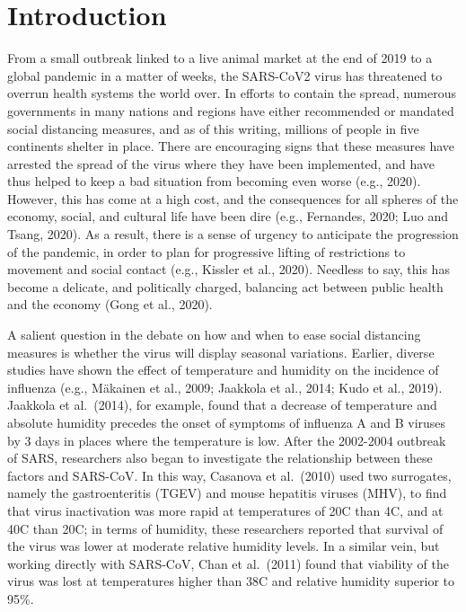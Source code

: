 \documentclass[]{elsarticle} %
\begin{document}
\hypertarget{introduction}{%
\section{Introduction}\label{introduction}}

From a small outbreak linked to a live animal market at the end of 2019
to a global pandemic in a matter of weeks, the SARS-CoV2 virus has
threatened to overrun health systems the world over. In efforts to
contain the spread, numerous governments in many nations and regions
have either recommended or mandated social distancing measures, and as
of this writing, millions of people in five continents shelter in place.
There are encouraging signs that these measures have arrested the spread
of the virus where they have been implemented, and have thus helped to
keep a bad situation from becoming even worse (e.g., 2020). However,
this has come at a high cost, and the consequences for all spheres of
the economy, social, and cultural life have been dire (e.g., Fernandes,
2020; Luo and Tsang, 2020). As a result, there is a sense of urgency to
anticipate the progression of the pandemic, in order to plan for
progressive lifting of restrictions to movement and social contact
(e.g., Kissler et al., 2020). Needless to say, this has become a
delicate, and politically charged, balancing act between public health
and the economy (Gong et al., 2020).

A salient question in the debate on how and when to ease social
distancing measures is whether the virus will display seasonal
variations. Earlier, diverse studies have shown the effect of
temperature and humidity on the incidence of influenza (e.g., Mäkainen
et al., 2009; Jaakkola et al., 2014; Kudo et al., 2019). Jaakkola et
al.~(2014), for example, found that a decrease of temperature and
absolute humidity precedes the onset of symptoms of influenza A and B
viruses by 3 days in places where the temperature is low. After the
2002-2004 outbreak of SARS, researchers also began to investigate the
relationship between these factors and SARS-CoV. In this way, Casanova
et al.~(2010) used two surrogates, namely the gastroenteritis (TGEV) and
mouse hepatitis viruses (MHV), to find that virus inactivation was more
rapid at temperatures of 20C than 4C, and at 40C than 20C; in terms of
humidity, these researchers reported that survival of the virus was
lower at moderate relative humidity levels. In a similar vein, but
working directly with SARS-CoV, Chan et al.~(2011) found that viability
of the virus was lost at temperatures higher than 38C and relative
humidity superior to 95\%.
\end{document}
